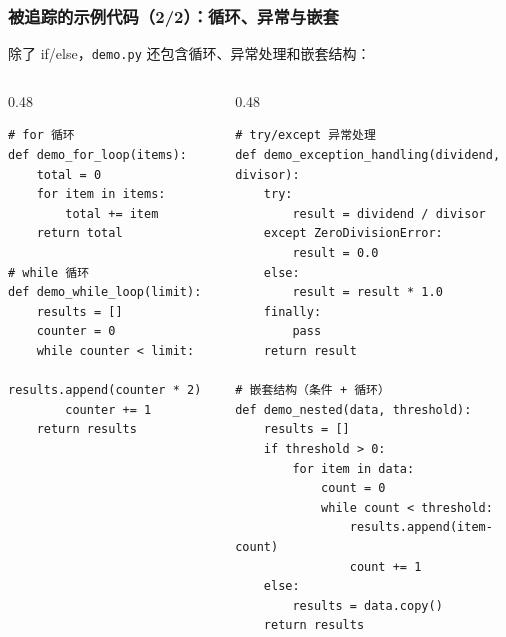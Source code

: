 \documentclass[presentation,aspectratio=169]{ctexbeamer}
\begin{document}
\begin{frame}[fragile]
\frametitle{被追踪的示例代码（2/2）：循环、异常与嵌套}
{\footnotesize 除了 if/else，\texttt{demo.py} 还包含循环、异常处理和嵌套结构：}

\vspace{0.05cm}
\begin{columns}[T]
\begin{column}{0.48\textwidth}
{\tiny
\begin{verbatim}
# for 循环
def demo_for_loop(items):
    total = 0
    for item in items:
        total += item
    return total

# while 循环
def demo_while_loop(limit):
    results = []
    counter = 0
    while counter < limit:
        results.append(counter * 2)
        counter += 1
    return results
\end{verbatim}}
\end{column}
\begin{column}{0.48\textwidth}
{\tiny
\begin{verbatim}
# try/except 异常处理
def demo_exception_handling(dividend, divisor):
    try:
        result = dividend / divisor
    except ZeroDivisionError:
        result = 0.0
    else:
        result = result * 1.0
    finally:
        pass
    return result

# 嵌套结构（条件 + 循环）
def demo_nested(data, threshold):
    results = []
    if threshold > 0:
        for item in data:
            count = 0
            while count < threshold:
                results.append(item-count)
                count += 1
    else:
        results = data.copy()
    return results
\end{verbatim}}
\end{column}
\end{columns}
\end{frame}

\end{document}
